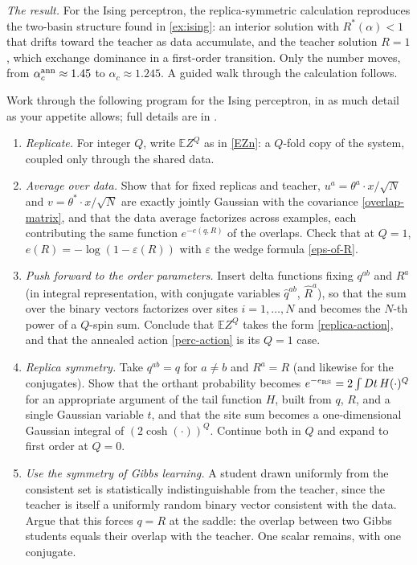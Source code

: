 \documentclass[11pt]{article}
\newcommand{\E}{\mathbb{E}}
\begin{document}
\emph{The result.} For the Ising perceptron, the replica-symmetric calculation \cite{gyorgyi1990first} reproduces the two-basin structure found in \cref{ex:ising}: an interior solution with $R^*(\alpha)<1$ that drifts toward the teacher as data accumulate, and the teacher solution $R=1$, which exchange dominance in a first-order transition. Only the number moves, from $\alpha_c^{\rm ann}\approx1.45$ to $\alpha_c\approx1.245$. A guided walk through the calculation follows.

\begin{exercise}
\label{ex:replica}
Work through the following program for the Ising perceptron, in as much detail as your appetite allows; full details are in \cite[chs.~2 and 7]{engel2001statistical}.
\begin{enumerate}
    \item \emph{Replicate.} For integer $Q$, write $\E Z^Q$ as in \eqref{EZn}: a $Q$-fold copy of the system, coupled only through the shared data.
    \item \emph{Average over data.} Show that for fixed replicas and teacher, $u^a = \theta^a\cdot x/\sqrt N$ and $v = \theta^*\cdot x/\sqrt N$ are exactly jointly Gaussian with the covariance \eqref{overlap-matrix}, and that the data average factorizes across examples, each contributing the same function $e^{-e(q,R)}$ of the overlaps. Check that at $Q=1$, $e(R) = -\log(1-\varepsilon(R))$ with $\varepsilon$ the wedge formula \eqref{eps-of-R}.
    \item \emph{Push forward to the order parameters.} Insert delta functions fixing $q^{ab}$ and $R^a$ (in integral representation, with conjugate variables $\hat q^{ab}$, $\hat R^a$), so that the sum over the binary vectors factorizes over sites $i=1,\ldots,N$ and becomes the $N$-th power of a $Q$-spin sum. Conclude that $\E Z^Q$ takes the form \eqref{replica-action}, and that the annealed action \eqref{perc-action} is its $Q=1$ case.
    \item \emph{Replica symmetry.} Take $q^{ab} = q$ for $a\neq b$ and $R^a = R$ (and likewise for the conjugates). Show that the orthant probability becomes $e^{-e_{\rm RS}} = 2\int Dt\,H(\cdot)^Q$ for an appropriate argument of the tail function $H$, built from $q$, $R$, and a single Gaussian variable $t$, and that the site sum becomes a one-dimensional Gaussian integral of $(2\cosh(\cdot))^Q$. Continue both in $Q$ and expand to first order at $Q=0$.
    \item \emph{Use the symmetry of Gibbs learning.} A student drawn uniformly from the consistent set is statistically indistinguishable from the teacher, since the teacher is itself a uniformly random binary vector consistent with the data. Argue that this forces $q = R$ at the saddle: the overlap between two Gibbs students equals their overlap with the teacher. One scalar remains, with one conjugate.

\end{enumerate}
\end{exercise}
\end{document}
